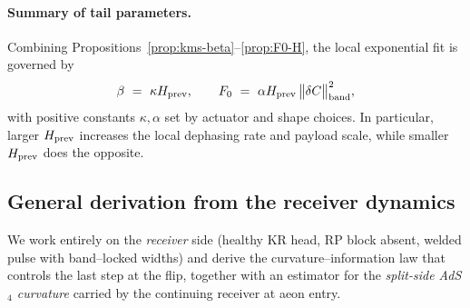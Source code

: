\documentclass[10pt]{article}
\theoremstyle{definition}
\theoremstyle{plain}
\begin{document}
\paragraph{Summary of tail parameters.} Combining Propositions~\ref{prop:kms-beta}–\ref{prop:F0-H},\label{par:uom-main-148}
the local exponential fit is governed by
\begin{equation}
\label{eq:tail-H}
\beta\ =\ \kappa H_{\rm prev},\qquad F_0\ =\ \alpha H_{\rm prev}\,\big\|\delta C\big\|^2_{\rm band},
\end{equation}
with positive constants $\kappa,\alpha$ set by actuator and shape choices. In particular, larger $H_{\rm prev}$
increases the local dephasing rate and payload scale, while smaller $H_{\rm prev}$ does the opposite.

\subsection{General derivation from the receiver dynamics}
\label{subsec:general-derivation}

We work entirely on the \emph{receiver} side (healthy KR head, RP block absent, welded pulse with
band–locked widths) and derive the curvature–information law that controls the last step at the flip,
together with an estimator for the \emph{split-side AdS$_4$ curvature} carried by the continuing receiver at aeon entry.
\end{document}
